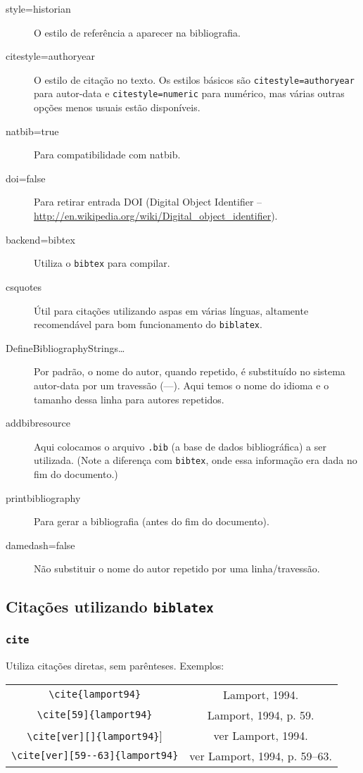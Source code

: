\begin{description}
\item[style=historian] O estilo de referência a aparecer na bibliografia.
\item[citestyle=authoryear] O estilo de citação no texto. Os estilos básicos são \texttt{citestyle=authoryear} para autor-data e \texttt{citestyle=numeric} para numérico, mas várias outras opções menos usuais estão disponíveis.
\item[natbib=true] Para compatibilidade com natbib.
\item[doi=false] Para retirar entrada \textsc{DOI} (Digital Object Identifier -- \url{http://en.wikipedia.org/wiki/Digital_object_identifier}).
\item[backend=bibtex] Utiliza o \texttt{bibtex} para compilar.
\item[csquotes] Útil para citações utilizando aspas em várias línguas, altamente recomendável para bom funcionamento do \texttt{biblatex}.
\item[DefineBibliographyStrings\ldots] Por padrão, o nome do autor, quando repetido, é substituído no sistema autor-data por um travessão (---). Aqui temos o nome do idioma e o tamanho dessa linha para autores repetidos.
\item[addbibresource] Aqui colocamos o arquivo \texttt{.bib} (a base de dados bibliográfica) a ser utilizada. (Note a diferença com \texttt{bibtex}, onde essa informação era dada no fim do documento.)
\item[printbibliography] Para gerar a bibliografia (antes do fim do documento).
\item[damedash=false] Não substituir o nome do autor repetido por uma linha/travessão.
\end{description}

\subsection{Citações utilizando \texttt{biblatex}}

\subsubsection*{\texttt{cite}}
Utiliza citações diretas, sem parênteses. Exemplos:


\begin{tabular}{cc}
\centering
\verb+\cite{lamport94}+ &  Lamport, 1994.\\

\verb+\cite[59]{lamport94}+ & Lamport, 1994, p. 59.\\

\verb+\cite[ver][]{lamport94}+] & ver Lamport, 1994.\\

\verb+\cite[ver][59--63]{lamport94}+ & ver Lamport, 1994, p. 59--63.\\
\end{tabular}

